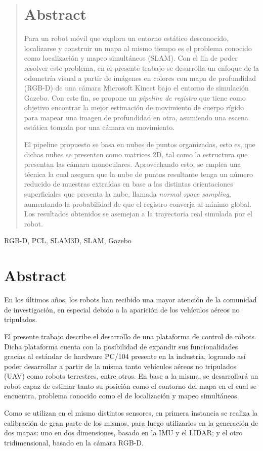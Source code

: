 \ifimagenes
\ifimagenespaper
\begin{abstract}
\else
\section*{Abstract}
\fi
Para un robot móvil que explora un entorno estático desconocido, localizarse y construir un mapa al mismo tiempo es el problema conocido como localización y mapeo simultáneos (SLAM). Con el fin de poder resolver este problema, en el presente trabajo se desarrolla un enfoque de la odometría visual a partir de imágenes en colores con mapa de profundidad (RGB-D) de una cámara Microsoft Kinect bajo el entorno de simulación Gazebo. Con este fin, se propone un \textit{pipeline de registro} que tiene como objetivo encontrar la mejor estimación de movimiento de cuerpo rígido para mapear una imagen de profundidad en otra, asumiendo una escena estática tomada por una cámara en movimiento. 

El pipeline propuesto se basa en nubes de puntos organizadas, esto es, que dichas nubes se presenten como matrices 2D, tal como la estructura que presentan las cámara monoculares. Aprovechando esto, se emplea una técnica la cual asegura que la nube de puntos resultante tenga un número reducido de muestras extraídas en base a las distintas orientaciones superficiales que presenta la nube, llamada \textit{normal space sampling}, aumentando la probabilidad de que el registro converja al mínimo global. Los resultados obtenidos se asemejan a la trayectoria real simulada por el robot.
\ifimagenespaper
\end{abstract}

\begin{IEEEkeywords}
RGB-D, PCL, SLAM3D, SLAM, Gazebo
\end{IEEEkeywords}
\else
\fi

\else
\section*{Abstract}
\label{sec:1_abstract}

En los últimos años, los robots han recibido una mayor atención de la comunidad de investigación, en especial debido a la aparición de los vehículos aéreos no tripulados.

El presente trabajo describe el desarrollo de una plataforma de control de robots. Dicha plataforma cuenta con la posibilidad de expandir sus funcionalidades gracias al estándar de hardware PC/104 presente en la industria, logrando así poder desarrollar a partir de la misma tanto vehículos aéreos no tripulados (UAV) como robots terrestres, entre otros. En base a la misma, se desarrollará un robot capaz de estimar tanto su posición como el contorno del mapa en el cual se encuentra, problema conocido como el de localización y mapeo simultáneos. 

Como se utilizan en el mismo distintos sensores, en primera instancia se realiza la calibración de gran parte de los mismos, para luego utilizarlos en la generación de dos mapas: uno en dos dimensiones, basado en la IMU y el LIDAR; y el otro tridimensional, basado en la cámara RGB-D.
\fi

